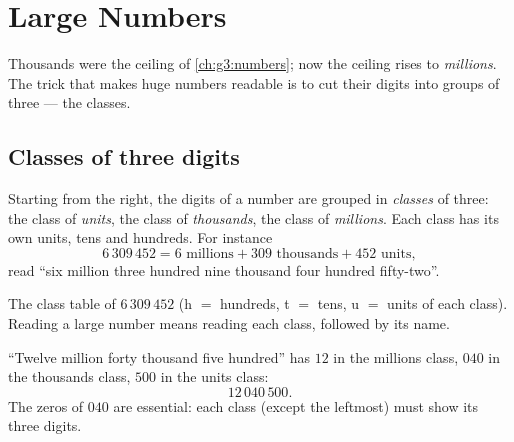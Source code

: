 \chapter{Large Numbers}\label{ch:g4:numbers}

Thousands were the ceiling of \cref{ch:g3:numbers}; now the ceiling
rises to \emph{millions}. The trick that makes huge numbers readable
is to cut their digits into groups of three --- the classes.

\section{Classes of three digits}

\begin{definition}[Classes]\label{def:g4:numbers:classes}
Starting from the right, the digits of a number are grouped in
\emph{classes} of three: the class of \emph{units}, the class of
\emph{thousands}, the class of \emph{millions}. Each class has its
own units, tens and hundreds. For instance
\[
6\,309\,452 = 6 \text{ millions} + 309 \text{ thousands}
+ 452 \text{ units},
\]
read ``six million three hundred nine thousand four hundred
fifty-two''.
\end{definition}

\begin{omfigure}

{\small The class table of $6\,309\,452$ (h $=$ hundreds, t $=$
tens, u $=$ units of each class). Reading a large number means
reading each class, followed by its name.}
\end{omfigure}

\begin{example}\label{ex:g4:numbers:write}
``Twelve million forty thousand five hundred'' has $12$ in the
millions class, $040$ in the thousands class, $500$ in the units
class:
\[
12\,040\,500 .
\]
The zeros of $040$ are essential: each class (except the leftmost)
must show its three digits.
\end{example}

